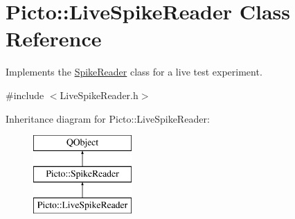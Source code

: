 \hypertarget{class_picto_1_1_live_spike_reader}{\section{Picto\-:\-:Live\-Spike\-Reader Class Reference}
\label{class_picto_1_1_live_spike_reader}
}


Implements the \hyperlink{class_picto_1_1_spike_reader}{Spike\-Reader} class for a live test experiment.  




{\ttfamily \#include $<$Live\-Spike\-Reader.\-h$>$}

Inheritance diagram for Picto\-:\-:Live\-Spike\-Reader\-:\begin{figure}[H]
\begin{center}
\leavevmode
\includegraphics[height=3.000000cm]{class_picto_1_1_live_spike_reader}
\end{center}
\end{figure}

